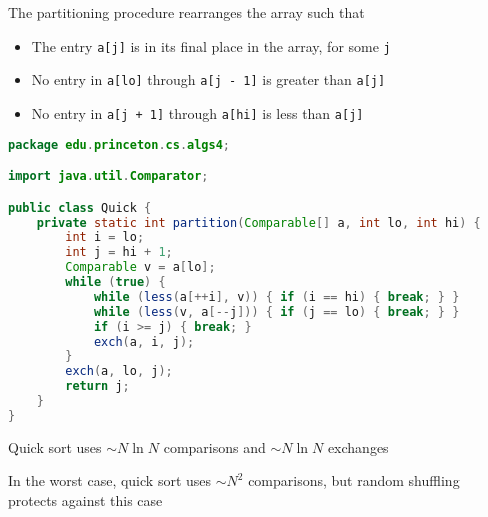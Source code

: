 \documentclass[8pt,a4paper,compress]{beamer}
\begin{document}
\begin{frame}[fragile]
\pause

The partitioning procedure rearranges the array such that
\begin{itemize}
\pause
\item The entry \lstinline{a[j]} is in its final place in the array, for some \lstinline{j}
\pause
\item No entry in \lstinline{a[lo]} through \lstinline{a[j - 1]} is greater than \lstinline{a[j]}
\pause
\item No entry in \lstinline{a[j + 1]} through \lstinline{a[hi]} is less than \lstinline{a[j]}
\end{itemize}

\pause
\bigskip

\begin{lstlisting}[language=Java,style=focusin]
package edu.princeton.cs.algs4;

import java.util.Comparator;

public class Quick {
    private static int partition(Comparable[] a, int lo, int hi) {
        int i = lo;
        int j = hi + 1;
        Comparable v = a[lo];
        while (true) { 
            while (less(a[++i], v)) { if (i == hi) { break; } }
            while (less(v, a[--j])) { if (j == lo) { break; } }
            if (i >= j) { break; }
            exch(a, i, j);
        }
        exch(a, lo, j);
        return j;
    }
}
\end{lstlisting}
\end{frame}

\begin{frame}[fragile]
\pause

Trace of partition operation
\begin{center}
}
\end{center}
\end{frame}

\begin{frame}[fragile]
\pause

Quick sort uses $\sim N\ln N$ comparisons and $\sim N\ln N$ exchanges

\pause
\bigskip

In the worst case, quick sort uses $\sim N^2$ comparisons, but random shuffling protects against this case
\end{frame}
\end{document}
